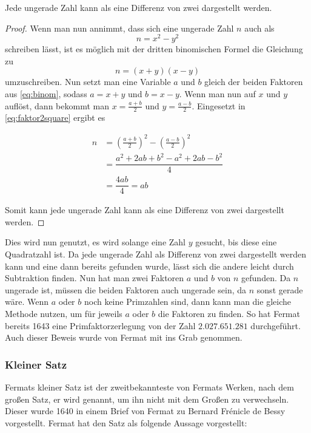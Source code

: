 \begin{theorem}
    Jede ungerade Zahl kann als eine Differenz von zwei  dargestellt werden.
\end{theorem}
\begin{proof}
    Wenn man nun annimmt, dass sich eine ungerade Zahl $n$ auch als \begin{equation} \label{eq:faktor2square}
        n = x^2 - y^2
    \end{equation}
    schreiben lässt, ist es möglich mit der dritten binomischen Formel die Gleichung zu
    \begin{equation} \label{eq:binom}
        n = (x+y)(x-y)
    \end{equation}
    umzuschreiben. Nun setzt man eine Variable $a$ und $b$ gleich der beiden Faktoren aus \eqref{eq:binom}, sodass $a = x + y$ und $b = x - y$. Wenn man nun auf $x$ und $y$ auflöst, dann bekommt man $x = \frac{a+b}{2}$ und $y = \frac{a-b}{2}$. Eingesetzt in \eqref{eq:faktor2square} ergibt es

    \begin{align*}
        n & = \left( \frac{a+b}{2} \right)^2 - \left( \frac{a-b}{2} \right)^2 \\
          & = \dfrac{a^2 + 2ab + b^2 - a^2 + 2ab - b^2}{4}                    \\
          & = \dfrac{4ab}{4} = ab
    \end{align*}

    Somit kann jede ungerade Zahl kann als eine Differenz von zwei  dargestellt werden.

\end{proof}

Dies wird nun genutzt, es wird solange eine Zahl $y$ gesucht, bis diese eine \Gls{Quadratzahl} ist. Da jede ungerade Zahl als Differenz von zwei  dargestellt werden kann und eine dann bereits gefunden wurde, lässt sich die andere leicht durch Subtraktion finden. Nun hat man zwei Faktoren $a$ und $b$ von $n$ gefunden. Da $n$ ungerade ist, müssen die beiden Faktoren auch ungerade sein, da $n$ sonst gerade wäre. Wenn $a$ oder $b$ noch keine Primzahlen sind, dann kann man die gleiche Methode nutzen, um für jeweils $a$ oder $b$ die Faktoren zu finden. So hat Fermat bereits 1643 eine Primfaktorzerlegung von der Zahl $2.027.651.281$ durchgeführt. Auch dieser Beweis wurde von Fermat mit ins Grab genommen.

\subsubsection{Kleiner Satz} \label{sec:klSatz}
Fermats kleiner Satz ist der zweitbekannteste von Fermats Werken, nach dem großen Satz, er wird  genannt, um ihn nicht mit dem Großen zu verwechseln. Dieser wurde 1640 in einem Brief von Fermat zu Bernard Frénicle de Bessy vorgestellt. Fermat hat den Satz als folgende Aussage vorgestellt:

